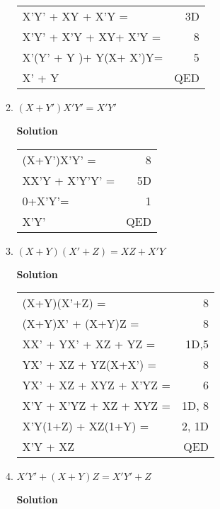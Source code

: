 \begin{enumerate}
\begin{enumerate}
\begin{onlysolution}
\begin{tabular}{lr}
X'Y' + XY + X'Y = 	& 3D\\
X'Y' + X'Y + XY+ X'Y =	& 8 \\
X'(Y' + Y )+ Y(X+ X')Y=	& 5 \\
X' + Y 			& QED \\
\end{tabular} \end{onlysolution}

	\item $(X+Y')X'Y' = X'Y'$

\begin{onlysolution}  \textbf{Solution} \itshape

\begin{tabular}{lr}
(X+Y')X'Y' = 	& 8 \\
XX'Y + X'Y'Y' = & 5D \\
0+X'Y'= 	& 1 \\
X'Y' 		& QED \\
\end{tabular}\end{onlysolution}

	\item $(X+Y)(X'+Z) = XZ + X'Y$

\begin{onlysolution}  \textbf{Solution} \itshape

\begin{tabular}{lr}
(X+Y)(X'+Z) = 		& 8 \\
(X+Y)X' + (X+Y)Z = 	& 8 \\
XX' + YX' + XZ + YZ =	& 1D,5 \\
YX' + XZ + YZ(X+X') =  	& 8 \\
YX' + XZ + XYZ + X'YZ =	& 6  \\
X'Y + X'YZ + XZ + XYZ =	& 1D, 8 \\
X'Y(1+Z) + XZ(1+Y) =  	& 2, 1D \\
X'Y + XZ 		& QED \\
\end{tabular} \end{onlysolution}

	\item $X'Y' + (X+Y)Z = X'Y' + Z$

\begin{onlysolution}  \textbf{Solution} \itshape


\end{onlysolution}
\end{enumerate}
\end{enumerate}
